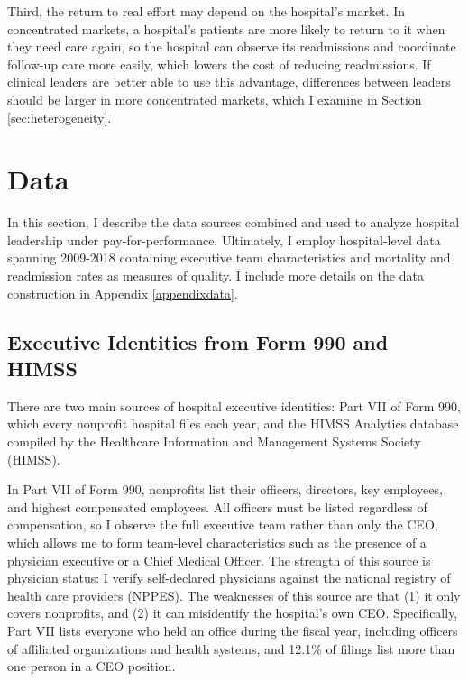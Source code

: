 \documentclass[12pt]{article}
\theoremstyle{definition}   %
\begin{document}
    Third, the return to real effort may depend on the hospital's market. In concentrated markets, a hospital's patients are more likely to return to it when they need care again, so the hospital can observe its readmissions and coordinate follow-up care more easily, which lowers the cost of reducing readmissions. If clinical leaders are better able to use this advantage, differences between leaders should be larger in more concentrated markets, which I examine in Section \ref{sec:heterogeneity}.

\section{Data}\label{sec:data}

In this section, I describe the data sources combined and used to analyze hospital leadership under pay-for-performance. Ultimately, I employ hospital-level data spanning 2009-2018 containing executive team characteristics and mortality and readmission rates as measures of quality. I include more details on the data construction in Appendix \ref{appendixdata}. 

    \subsection{Executive Identities from Form 990 and HIMSS}

    There are two main sources of hospital executive identities: Part VII of Form 990, which every nonprofit hospital files each year, and the HIMSS Analytics database compiled by the Healthcare Information and Management Systems Society (HIMSS).
 
    In Part VII of Form 990, nonprofits list their officers, directors, key employees, and highest compensated employees. All officers must be listed regardless of compensation, so I observe the full executive team rather than only the CEO, which allows me to form team-level characteristics such as the presence of a physician executive or a Chief Medical Officer. The strength of this source is physician status: I verify self-declared physicians against the national registry of health care providers (NPPES). The weaknesses of this source are that (1) it only covers nonprofits, and (2) it can misidentify the hospital's own CEO. Specifically, Part VII lists everyone who held an office during the fiscal year, including officers of affiliated organizations and health systems, and 12.1\% of filings list more than one person in a CEO position.
 
\end{document}
